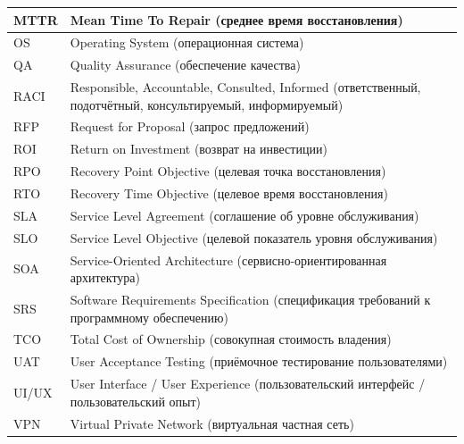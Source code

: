 \documentclass{SibFU-docs}
\begin{document}
{\begin{tabular}{|p{}|p{}|}
\hline
MTTR & Mean Time To Repair (среднее время восстановления) \\
\hline
OS & Operating System (операционная система) \\
\hline
QA & Quality Assurance (обеспечение качества) \\
\hline
RACI & Responsible, Accountable, Consulted, Informed (ответственный, подотчётный, консультируемый, информируемый) \\
\hline
RFP & Request for Proposal (запрос предложений) \\
\hline
ROI & Return on Investment (возврат на инвестиции) \\
\hline
RPO & Recovery Point Objective (целевая точка восстановления) \\
\hline
RTO & Recovery Time Objective (целевое время восстановления) \\
\hline
SLA & Service Level Agreement (соглашение об уровне обслуживания) \\
\hline
SLO & Service Level Objective (целевой показатель уровня обслуживания) \\
\hline
SOA & Service-Oriented Architecture (сервисно-ориентированная архитектура) \\
\hline
SRS & Software Requirements Specification (спецификация требований к программному обеспечению) \\
\hline
TCO & Total Cost of Ownership (совокупная стоимость владения) \\
\hline
UAT & User Acceptance Testing (приёмочное тестирование пользователями) \\
\hline
UI/UX & User Interface / User Experience (пользовательский интерфейс / пользовательский опыт) \\
\hline
VPN & Virtual Private Network (виртуальная частная сеть) \\
\hline
\end{tabular}
}

\clearpage
\nocite{*}
\printbibliography[heading=bibliography]
\end{document}
